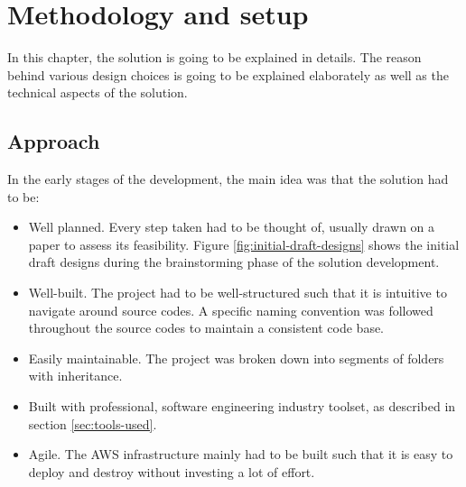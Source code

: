


\chapter{Methodology and setup}
\label{chap:methodology-and-setup}

In this chapter, the solution is going to be explained in details. The reason behind various design choices is going to be explained elaborately as well as the technical aspects of the solution.


\section{Approach}
\label{sec:approach}

In the early stages of the development, the main idea was that the solution had to be:

\begin{itemize}
    \item Well planned. Every step taken had to be thought of, usually drawn on a paper to assess its feasibility. Figure \ref{fig:initial-draft-designs} shows the initial draft designs during the brainstorming phase of the solution development.
    \item Well-built. The project had to be well-structured such that it is intuitive to navigate around source codes. A specific naming convention was followed throughout the source codes to maintain a consistent code base.
    \item Easily maintainable. The project was broken down into segments of folders with inheritance.
    \item Built with professional, software engineering industry toolset, as described in section \ref{sec:tools-used}.
    \item Agile. The AWS infrastructure mainly had to be built such that it is easy to deploy and destroy without investing a lot of effort.
\end{itemize}

